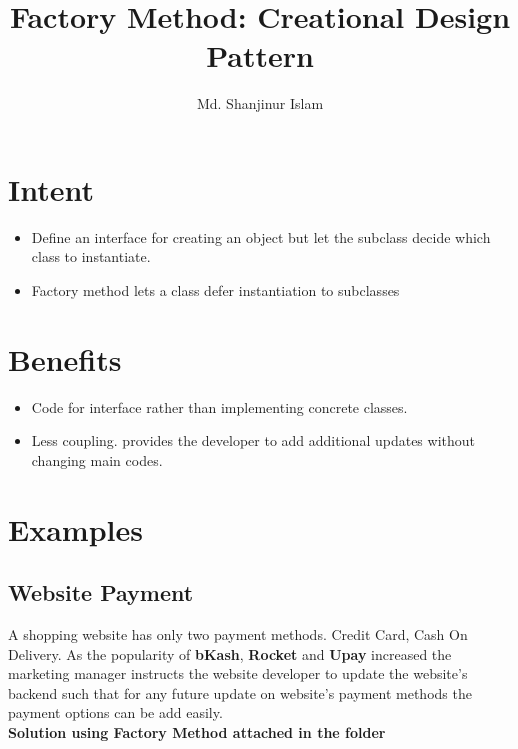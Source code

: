 \documentclass{article}
\title{Factory Method: Creational Design Pattern}
\author{Md. Shanjinur Islam}
\begin{document}
	\maketitle
	\newpage
	\section{Intent}
		\begin{itemize}
			\item Define an interface for creating an object but let the subclass decide which class to instantiate.
			\item Factory method lets a class defer instantiation to subclasses
		\end{itemize}
	\section{Benefits}
		
		\begin{itemize}
			\item Code for interface rather than implementing concrete classes.
			\item Less coupling. provides the developer to add additional updates without changing main codes.
		\end{itemize}
	
	\section{Examples}

		\subsection{Website Payment}
			
			A shopping website has only two payment methods. Credit Card, Cash On Delivery. As the popularity
			of \textbf{bKash}, \textbf{Rocket} and \textbf{Upay} increased the marketing manager instructs the website developer to update the website's
			backend such that for any future update on website's payment methods the payment options can be add easily.\\

		\textbf{Solution using Factory Method attached in the folder}
 		
	
\end{document}
